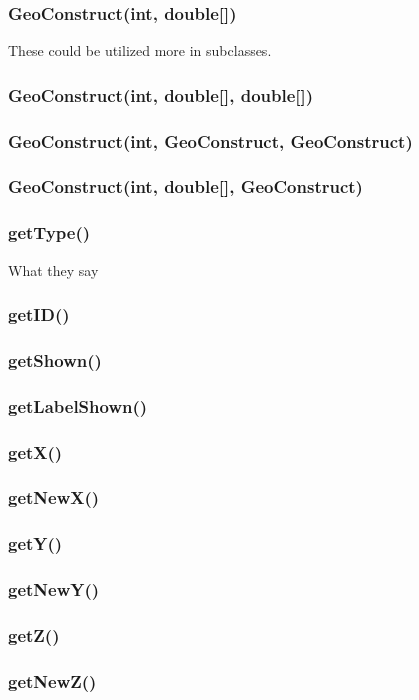 \documentclass[a4paper,10pt]{report}
\begin{document}
\subsubsection{GeoConstruct(int, double[])}  These could be utilized more in subclasses.
\subsubsection{GeoConstruct(int, double[], double[])}
\subsubsection{GeoConstruct(int, GeoConstruct, GeoConstruct)}
\subsubsection{GeoConstruct(int, double[], GeoConstruct)}
\subsubsection{getType()} What they say
\subsubsection{getID()}
\subsubsection{getShown()}
\subsubsection{getLabelShown()}
\subsubsection{getX()}
\subsubsection{getNewX()}
\subsubsection{getY()}
\subsubsection{getNewY()}
\subsubsection{getZ()}
\subsubsection{getNewZ()}
\end{document}
